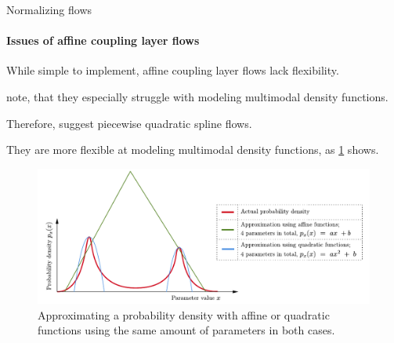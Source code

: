 \documentclass{beamer}
\begin{document}
\begin{frame}[allowframebreaks]{Normalizing flows}
	\framesubtitle{Issues of affine coupling layer flows}
While simple to implement, affine coupling layer flows lack flexibility.

\cite[p.3]{Durkan.10.06.2019} note, that they especially struggle with modeling multimodal density functions.

Therefore, \cite[p.4]{Durkan.10.06.2019} suggest piecewise quadratic spline flows.

They are more flexible at modeling multimodal density functions, as \cref{fig:affinevsquadratic} shows.

\begin{figure}[h]
	\centering
	\includegraphics[width=\textwidth]{figures/presentation/affinevsquadratic.pdf}
	\caption{Approximating a probability density with affine or quadratic functions using the same amount of parameters in both cases.}
	\label{fig:affinevsquadratic}
\end{figure}
\end{frame}
\end{document}

